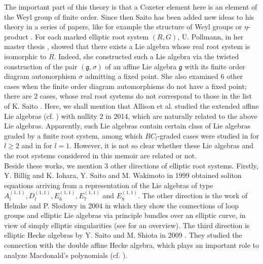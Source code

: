 \documentclass[11pt]{amsart}
\newcommand{\fg}{\mathfrak{g}}
\begin{document}
The important part of this theory is that a Coxeter element here is an element of the Weyl group of finite order. Since then Saito has been added new ideas to his theory in a series of papers, like for example the structure of Weyl groups \cite{SaitoTakebayashi1997} or $\eta$-product \cite{Saito2001}. For each marked elliptic root system $(R,G)$, U. Pollmann, in her master thesis \cite{Pollmann1994}, showed that there exists a Lie algebra whose real root system is isomorphic to $R$. Indeed, she constructed such a Lie algebra via the twisted construction of the pair $(\fg, \sigma)$ of an affine Lie algebra $\fg$ with its finite order diagram automorphism $\sigma$ admitting a fixed point. She also examined $6$ other cases when the finite order diagram automorphisms do not have a fixed point; there are $2$ cases, whose real root systems do not correspond to those in the list of K. Saito \cite{Saito1985}. Here, we shall mention that Allison et al. \cite{AllisonBermanPianzola2014} studied the extended affine Lie algebras (cf. \cite{AllisonAzamBermanGaoPianzola1997}) with nullity $2$  in 2014, which are naturally related to the above Lie algebras. Apparently, such Lie algebras contain certain class of Lie algebras graded by a finite root system, among which $BC_l$-graded cases were studied in \cite{AllisonBenkartGao2002} for $l\geq 2$ and in \cite{BenkartSmirnov2003} for $l=1$. 
However, it is not so clear whether these Lie algebras and the root systems considered in this memoir are related or not.
\\

Beside these works, we mention 3 other directions of elliptic root systems. 
Firstly, Y. Billig \cite{Billig1999}  and K. Iohara, Y. Saito and M. Wakimoto 
\cite{IoharaSaitoWakimoto1999a, IoharaSaitoWakimoto1999b} in 1999 obtained 
soliton equations arriving from a representation of the Lie algebras of type 
$A_l^{(1,1)}, D_l^{(1,1)}, E_6^{(1,1)}, E_7^{(1,1)}$ and $E_8^{(1,1)}$. 
The other direction is the work of Helmke and P. Slodowy in 2004 
\cite{HelmkeSlodowy2004} in which they show the connections of loop groups and 
elliptic Lie algebras via principle bundles over an elliptic curve, in view of simply elliptic 
singularities (see \cite{HelmkeSlodowy2005} for an overview). 
The third direction is elliptic Hecke algebras by Y. Saito and M. Shiota in 2009 
\cite{SaitoShiota2009}. 
They studied the connection with the double affine Hecke algebra, which plays an 
important role to analyze Macdonald's polynomials (cf. \cite{Macdonald2003}). \\
\end{document}
